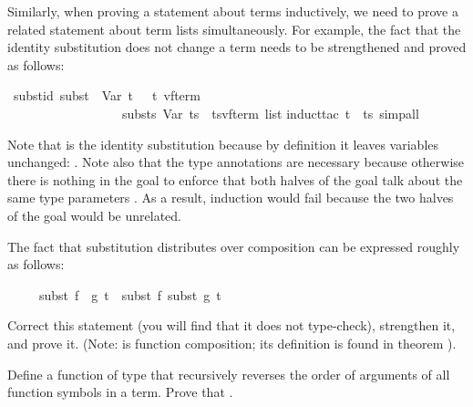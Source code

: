 \begin{isabellebody}
\begin{isamarkuptext}
Similarly, when proving a statement about terms inductively, we need
to prove a related statement about term lists simultaneously. For example,
the fact that the identity substitution does not change a term needs to be
strengthened and proved as follows:%
\end{isamarkuptext}%
\isamarkuptrue%
\isamarkupfalse%
\ subst{\isacharunderscore}id{\isacharcolon}\ {\isachardoublequoteopen}subst\ \ Var\ t\ \ {\isacharequal}\ {\isacharparenleft}t\ {\isacharcolon}{\isacharcolon}{\isacharparenleft}{\isacharprime}v{\isacharcomma}{\isacharprime}f{\isacharparenright}term{\isacharparenright}\ \ {\isasymand}\isanewline
\ \ \ \ \ \ \ \ \ \ \ \ \ \ \ \ \ \ substs\ Var\ ts\ {\isacharequal}\ {\isacharparenleft}ts{\isacharcolon}{\isacharcolon}{\isacharparenleft}{\isacharprime}v{\isacharcomma}{\isacharprime}f{\isacharparenright}term\ list{\isacharparenright}{\isachardoublequoteclose}\isanewline
%
\isadelimproof
%
\endisadelimproof
%
\isatagproof
{}\isamarkupfalse%
{\isacharparenleft}induct{\isacharunderscore}tac\ t\ \ ts{\isacharcomma}\ simp{\isacharunderscore}all{\isacharparenright}\isanewline
{}\isamarkupfalse%
%
\endisatagproof
{\isafoldproof}%
%
\isadelimproof
%
\endisadelimproof
%
\begin{isamarkuptext}%
\noindent
Note that  is the identity substitution because by definition it
leaves variables unchanged: . Note also
that the type annotations are necessary because otherwise there is nothing in
the goal to enforce that both halves of the goal talk about the same type
parameters . As a result, induction would fail
because the two halves of the goal would be unrelated.

\begin{exercise}
The fact that substitution distributes over composition can be expressed
roughly as follows:
\begin{isabelle}%
\ \ \ \ \ subst\ {\isacharparenleft}f\ {\isasymcirc}\ g{\isacharparenright}\ t\ {\isacharequal}\ subst\ f\ {\isacharparenleft}subst\ g\ t{\isacharparenright}%
\end{isabelle}
Correct this statement (you will find that it does not type-check),
strengthen it, and prove it. (Note: \isa{{\isasymcirc}} is function composition;
its definition is found in theorem ).
\end{exercise}
\begin{exercise}\label{ex:trev-trev}
  Define a function  of type 
that recursively reverses the order of arguments of all function symbols in a
  term. Prove that .
\end{exercise}


\end{isamarkuptext}
\end{isabellebody}
